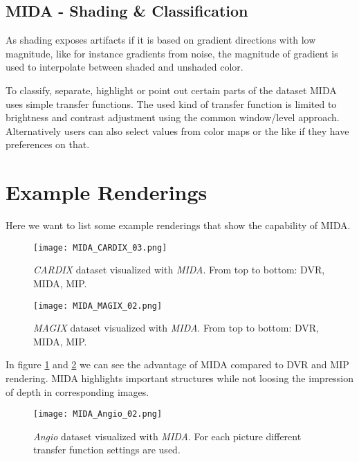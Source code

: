 \subsection{MIDA - Shading \& Classification}

As shading exposes artifacts if it is based on gradient directions with low magnitude, like for instance gradients from noise, the magnitude of gradient is used to interpolate between shaded and unshaded color.

To classify, separate, highlight or point out certain parts of the dataset MIDA uses simple transfer functions.
The used kind of transfer function is limited to brightness and contrast adjustment using the common window/level approach.
Alternatively users can also select values from color maps or the like if they have preferences on that.


\section{Example Renderings}

Here we want to list some example renderings that show the capability of MIDA.

\begin{figure}[h]
	\centering
	\texttt{[image: MIDA\_CARDIX\_03.png]} \\
	\caption{ \emph{CARDIX}\cite{gimias_sampledata_2018} dataset visualized with \emph{MIDA}. From top to bottom: DVR, MIDA, MIP.}
	\label{fig:MIDA_CARDIX_03}
\end{figure}


\begin{figure}[h]
	\centering
	\texttt{[image: MIDA\_MAGIX\_02.png]} \\
	\caption{ \emph{MAGIX}\cite{gimias_sampledata_2018} dataset visualized with \emph{MIDA}. From top to bottom: DVR, MIDA, MIP.}
	\label{fig:MIDA_MAGIX_02}
\end{figure}

In figure \ref{fig:MIDA_CARDIX_03} and \ref{fig:MIDA_MAGIX_02} we can see the advantage of MIDA compared to DVR and MIP rendering. MIDA highlights important structures while not loosing the impression of depth in corresponding images.

\begin{figure}[h]
	\centering
	\texttt{[image: MIDA\_Angio\_02.png]} \\
	\caption{ \emph{Angio}\cite{gimias_sampledata_2018} dataset visualized with \emph{MIDA}. For each picture different transfer function settings are used.}
	\label{fig:MIDA_Angio_02}
\end{figure}

